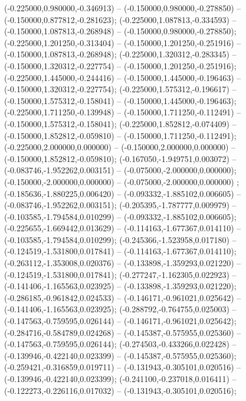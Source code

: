  (-0.225000,0.980000,-0.346913) -- (-0.150000,0.980000,-0.278850) -- (-0.150000,0.877812,-0.281623);
 (-0.225000,1.087813,-0.334593) -- (-0.150000,1.087813,-0.268948) -- (-0.150000,0.980000,-0.278850);
 (-0.225000,1.201250,-0.313404) -- (-0.150000,1.201250,-0.251916) -- (-0.150000,1.087813,-0.268948);
 (-0.225000,1.320312,-0.283345) -- (-0.150000,1.320312,-0.227754) -- (-0.150000,1.201250,-0.251916);
 (-0.225000,1.445000,-0.244416) -- (-0.150000,1.445000,-0.196463) -- (-0.150000,1.320312,-0.227754);
 (-0.225000,1.575312,-0.196617) -- (-0.150000,1.575312,-0.158041) -- (-0.150000,1.445000,-0.196463);
 (-0.225000,1.711250,-0.139948) -- (-0.150000,1.711250,-0.112491) -- (-0.150000,1.575312,-0.158041);
 (-0.225000,1.852812,-0.074409) -- (-0.150000,1.852812,-0.059810) -- (-0.150000,1.711250,-0.112491);
 (-0.225000,2.000000,0.000000) -- (-0.150000,2.000000,0.000000) -- (-0.150000,1.852812,-0.059810);
 (-0.167050,-1.949751,0.003072) -- (-0.083746,-1.952262,0.003151) -- (-0.075000,-2.000000,0.000000);
 (-0.150000,-2.000000,0.000000) -- (-0.075000,-2.000000,0.000000) ;
 (-0.185636,-1.880225,0.006420) -- (-0.093332,-1.885102,0.006605) -- (-0.083746,-1.952262,0.003151);
 (-0.205395,-1.787777,0.009979) -- (-0.103585,-1.794584,0.010299) -- (-0.093332,-1.885102,0.006605);
 (-0.225655,-1.669442,0.013629) -- (-0.114163,-1.677367,0.014110) -- (-0.103585,-1.794584,0.010299);
 (-0.245366,-1.523958,0.017180) -- (-0.124519,-1.531800,0.017841) -- (-0.114163,-1.677367,0.014110);
 (-0.263112,-1.353008,0.020376) -- (-0.133898,-1.359293,0.021220) -- (-0.124519,-1.531800,0.017841);
 (-0.277247,-1.162305,0.022923) -- (-0.141406,-1.165563,0.023925) -- (-0.133898,-1.359293,0.021220);
 (-0.286185,-0.961842,0.024533) -- (-0.146171,-0.961021,0.025642) -- (-0.141406,-1.165563,0.023925);
 (-0.288792,-0.764755,0.025003) -- (-0.147563,-0.759595,0.026144) -- (-0.146171,-0.961021,0.025642);
 (-0.284716,-0.584789,0.024268) -- (-0.145387,-0.575955,0.025360) -- (-0.147563,-0.759595,0.026144);
 (-0.274503,-0.433266,0.022428) -- (-0.139946,-0.422140,0.023399) -- (-0.145387,-0.575955,0.025360);
 (-0.259421,-0.316859,0.019711) -- (-0.131943,-0.305101,0.020516) -- (-0.139946,-0.422140,0.023399);
 (-0.241100,-0.237018,0.016411) -- (-0.122273,-0.226116,0.017032) -- (-0.131943,-0.305101,0.020516);
